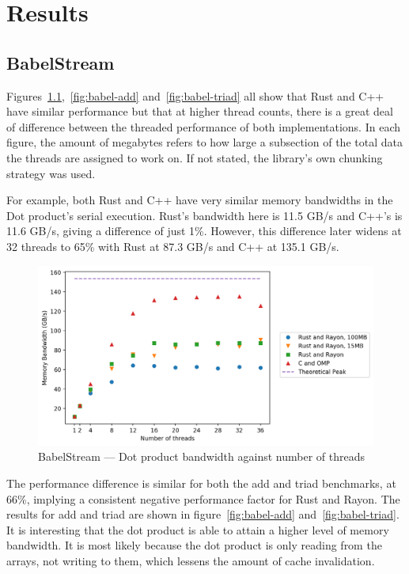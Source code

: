 \chapter{Results}\label{sec:res}
\section{BabelStream}\label{sec:res-babel}
Figures~\ref{fig:babel-dot},~\ref{fig:babel-add} and~\ref{fig:babel-triad} all show that Rust and C++ have similar performance but that at higher thread counts, there is a great deal of difference between the threaded performance of both implementations. In each figure, the amount of megabytes refers to how large a subsection of the total data the threads are assigned to work on. If not stated, the library's own chunking strategy was used.

For example, both Rust and C++ have very similar memory bandwidths in the Dot product's serial execution. Rust's bandwidth here is 11.5 GB/s and C++'s is 11.6 GB/s, giving a difference of just 1\%.
However, this difference later widens at 32 threads to 65\% with Rust at 87.3 GB/s and C++ at 135.1 GB/s.

\begin{figure}[h]
\centering
\includegraphics[width=.9\linewidth]{figs/babel/Dot.png}
\caption[BabelStream --- Dot]{BabelStream --- Dot product bandwidth against number of threads}\label{fig:babel-dot}
\end{figure}

The performance difference is similar for both the add and triad benchmarks, at 66\%, implying a consistent negative performance factor for Rust and Rayon. The results for add and triad are shown in figure~\ref{fig:babel-add} and~\ref{fig:babel-triad}.
It is interesting that the dot product is able to attain a higher level of memory bandwidth. It is most likely because the dot product is only reading from the arrays, not writing to them, which lessens the amount of cache invalidation.

